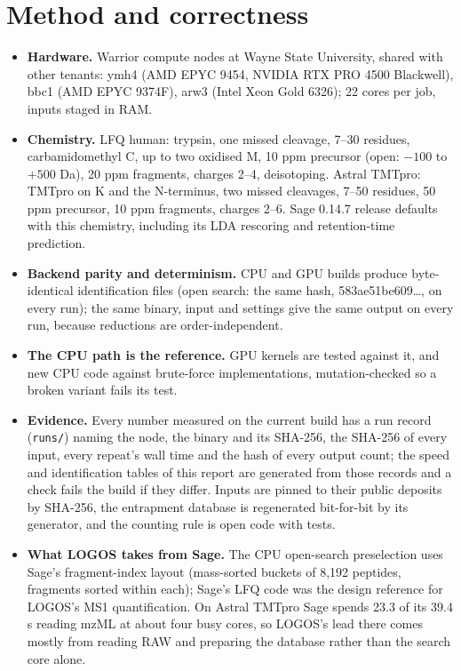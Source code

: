 \section{Method and correctness}
\begin{itemize}
\item \textbf{Hardware.} Warrior compute nodes at Wayne State University, shared with other tenants: ymh4 (AMD EPYC 9454, NVIDIA RTX PRO 4500 Blackwell), bbc1 (AMD EPYC 9374F), arw3 (Intel Xeon Gold 6326); 22 cores per job, inputs staged in RAM.
\item \textbf{Chemistry.} LFQ human: trypsin, one missed cleavage, 7--30 residues, carbamidomethyl C, up to two oxidised M, 10 ppm precursor (open: $-100$ to $+500$ Da), 20 ppm fragments, charges 2--4, deisotoping. Astral TMTpro: TMTpro on K and the N-terminus, two missed cleavages, 7--50 residues, 50 ppm precursor, 10 ppm fragments, charges 2--6. Sage 0.14.7 release defaults with this chemistry, including its LDA rescoring and retention-time prediction.
\item \textbf{Backend parity and determinism.} CPU and GPU builds produce byte-identical identification files (open search: the same hash, 583ae51be609\dots, on every run); the same binary, input and settings give the same output on every run, because reductions are order-independent.
\item \textbf{The CPU path is the reference.} GPU kernels are tested against it, and new CPU code against brute-force implementations, mutation-checked so a broken variant fails its test.
\item \textbf{Evidence.} Every number measured on the current build has a run record (\texttt{runs/}) naming the node, the binary and its SHA-256, the SHA-256 of every input, every repeat's wall time and the hash of every output count; the speed and identification tables of this report are generated from those records and a check fails the build if they differ. Inputs are pinned to their public deposits by SHA-256, the entrapment database is regenerated bit-for-bit by its generator, and the counting rule is open code with tests.
\item \textbf{What LOGOS takes from Sage.} The CPU open-search preselection uses Sage's fragment-index layout (mass-sorted buckets of 8,192 peptides, fragments sorted within each); Sage's LFQ code was the design reference for LOGOS's MS1 quantification. On Astral TMTpro Sage spends 23.3 of its 39.4 s reading mzML at about four busy cores, so LOGOS's lead there comes mostly from reading RAW and preparing the database rather than the search core alone.
\end{itemize}


